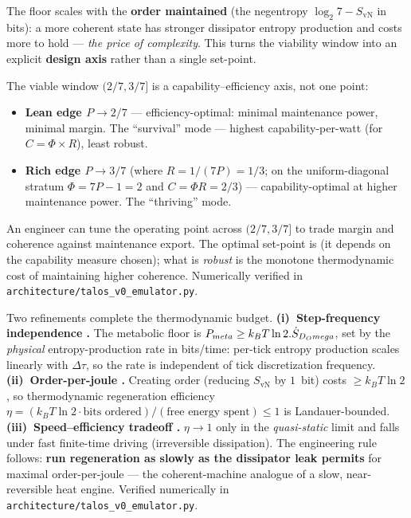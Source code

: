 The floor scales with the \textbf{order maintained} (the negentropy
$\log_2 7 - S_{\mathrm{vN}}$ in bits): a more coherent state has stronger
dissipator entropy production and costs more to hold --- \emph{the price of
complexity}. This turns the viability window into an explicit \textbf{design
axis} rather than a single set-point.

\begin{claimbox}
The viable window $(2/7,3/7]$ is a capability--efficiency axis, not one point:
\begin{itemize}[leftmargin=1.4em,itemsep=1pt]
  \item \textbf{Lean edge $P\to 2/7$} --- efficiency-optimal: minimal maintenance
        power, minimal margin. The ``survival'' mode --- highest
        capability-per-watt (for $C=\Phi\times R$), least robust.
  \item \textbf{Rich edge $P\to 3/7$} (where $R=1/(7P)=1/3$; on the
        uniform-diagonal stratum $\Phi=7P-1=2$ and $C=\Phi R=2/3$) ---
        capability-optimal at higher maintenance power. The ``thriving'' mode.
\end{itemize}
An engineer can tune the operating point across $(2/7,3/7]$ to trade margin and
coherence against maintenance export. The optimal set-point is  (it
depends on the capability measure chosen); what is \emph{robust} is the
monotone thermodynamic cost of maintaining higher coherence. Numerically
verified in \texttt{architecture/talos\_v0\_emulator.py}.
\end{claimbox}

\begin{claimbox}
Two refinements complete the thermodynamic budget. \textbf{(i)~Step-frequency
independence .} The metabolic floor is
$P_{meta} \ge k_B T\ln 2.\dot S_{D_Omega}$, set by the
\emph{physical} entropy-production rate in bits/time: per-tick entropy
production scales linearly with $\Delta\tau$, so the rate is independent of
tick discretization frequency.
\textbf{(ii)~Order-per-joule .} Creating order (reducing
$S_{\mathrm{vN}}$ by $1$~bit) costs $\geq k_B T\ln 2$, so thermodynamic
regeneration efficiency
$\eta = (k_B T\ln 2\cdot\text{bits ordered})/(\text{free energy spent}) \leq 1$
is Landauer-bounded. \textbf{(iii)~Speed--efficiency tradeoff .}
$\eta\to 1$ only in the \emph{quasi-static} limit and falls under fast
finite-time driving (irreversible dissipation). The engineering rule follows:
\textbf{run regeneration as slowly as the dissipator leak permits} for maximal
order-per-joule --- the coherent-machine analogue of a slow, near-reversible
heat engine. Verified numerically in \texttt{architecture/talos\_v0\_emulator.py}.
\end{claimbox}

